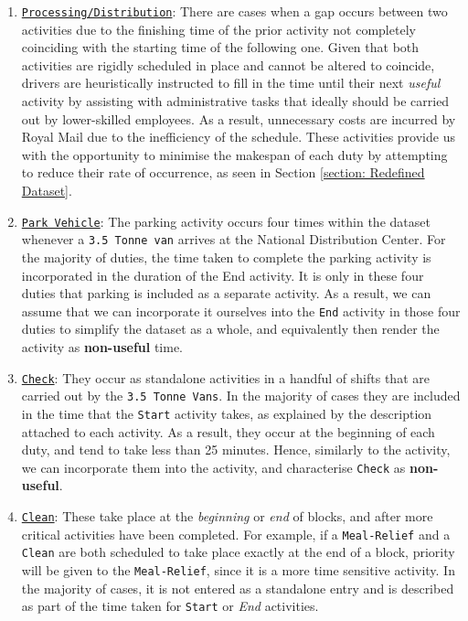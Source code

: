 \begin{enumerate}
    \item \underline{\texttt{Processing/Distribution}}: There are cases when a gap occurs between two activities due to the finishing time of the prior activity not completely coinciding with the starting time of the following one. Given that both activities are rigidly scheduled in place and cannot be altered to coincide, drivers are heuristically instructed to fill in the time until their next \textit{useful} activity by assisting with administrative tasks that ideally should be carried out by lower-skilled employees. As a result, unnecessary costs are incurred by Royal Mail due to the inefficiency of the schedule. These activities provide us with the opportunity to minimise the makespan of each duty by attempting to reduce their rate of occurrence, as seen in Section \ref{section: Redefined Dataset}. 
   
    \item \underline{\texttt{Park Vehicle}}: The parking activity occurs four times within the dataset whenever a \texttt{3.5 Tonne van} arrives at the National Distribution Center. For the majority of duties, the time taken to complete the parking activity is incorporated in the duration of the End activity. It is only in these four duties that parking is included as a separate activity. As a result, we can assume that we can incorporate it ourselves into the \texttt{End} activity in those four duties to simplify the dataset as a whole, and equivalently then render the  activity as \textbf{non-useful} time.
    
    \item \underline{\texttt{Check}}: They occur  as standalone activities in a handful of shifts that are carried out by the \texttt{3.5 Tonne Vans}. In the majority of cases they are included in the time that the \texttt{Start} activity takes, as explained by the description attached to each activity. As a result, they occur at the beginning of each duty, and tend to take less than 25 minutes. Hence, similarly to the  activity, we can incorporate them into the  activity, and characterise \texttt{Check} as \textbf{non-useful}.
    
    \item \underline{\texttt{Clean}}: These take place at the \textit{beginning} or \textit{end} of blocks, and after more critical activities have been completed. For example, if a \texttt{Meal-Relief} and a \texttt{Clean} are both scheduled to take place exactly at the end of a block, priority will be given to the \texttt{Meal-Relief}, since it is a more time sensitive activity. In the majority of cases, it is not entered as a standalone entry and is described as part of the time taken for \texttt{Start} or \textit{End} activities. 
\end{enumerate}

